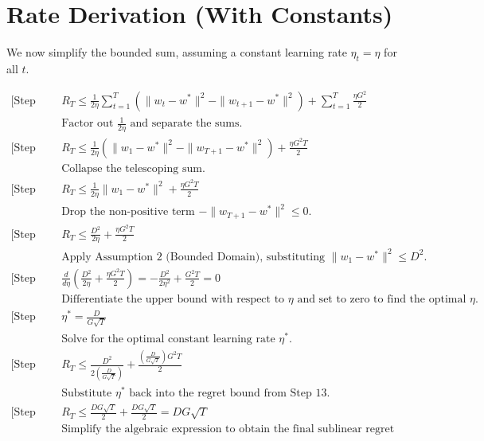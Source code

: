 \documentclass[11pt]{article}
\begin{document}
\section*{Rate Derivation (With Constants)}
We now simplify the bounded sum, assuming a constant learning rate $\eta_t = \eta$ for all $t$.

\begin{align*}
\text{[Step 10]} \quad & R_T \le \frac{1}{2\eta} \sum_{t=1}^T \left( \|w_t - w^*\|^2 - \|w_{t+1} - w^*\|^2 \right) + \sum_{t=1}^T \frac{\eta G^2}{2} \\
& \text{Factor out } \frac{1}{2\eta} \text{ and separate the sums.} \\
\text{[Step 11]} \quad & R_T \le \frac{1}{2\eta} \left( \|w_1 - w^*\|^2 - \|w_{T+1} - w^*\|^2 \right) + \frac{\eta G^2 T}{2} \\
& \text{Collapse the telescoping sum.} \\
\text{[Step 12]} \quad & R_T \le \frac{1}{2\eta} \|w_1 - w^*\|^2 + \frac{\eta G^2 T}{2} \\
& \text{Drop the non-positive term } -\|w_{T+1} - w^*\|^2 \le 0. \\
\text{[Step 13]} \quad & R_T \le \frac{D^2}{2\eta} + \frac{\eta G^2 T}{2} \\
& \text{Apply Assumption 2 (Bounded Domain), substituting } \|w_1 - w^*\|^2 \le D^2. \\
\text{[Step 14]} \quad & \frac{d}{d\eta} \left( \frac{D^2}{2\eta} + \frac{\eta G^2 T}{2} \right) = -\frac{D^2}{2\eta^2} + \frac{G^2 T}{2} = 0 \\
& \text{Differentiate the upper bound with respect to } \eta \text{ and set to zero to find the optimal } \eta. \\
\text{[Step 15]} \quad & \eta^* = \frac{D}{G\sqrt{T}} \\
& \text{Solve for the optimal constant learning rate } \eta^*. \\
\text{[Step 16]} \quad & R_T \le \frac{D^2}{2 \left( \frac{D}{G\sqrt{T}} \right)} + \frac{\left( \frac{D}{G\sqrt{T}} \right) G^2 T}{2} \\
& \text{Substitute } \eta^* \text{ back into the regret bound from Step 13.} \\
\text{[Step 17]} \quad & R_T \le \frac{D G \sqrt{T}}{2} + \frac{D G \sqrt{T}}{2} = D G \sqrt{T} \\
& \text{Simplify the algebraic expression to obtain the final sublinear regret bound.}
\end{align*}
\end{document}
